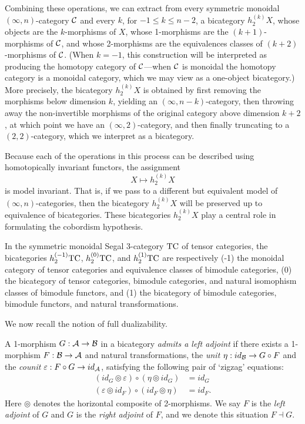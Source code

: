 \documentclass[a4paper]{amsart}
\begin{document}
Combining these operations, we can extract from every symmetric monoidal $(\infty,n)$-category $\mathcal C$ and every $k$, for $-1 \leq k \leq n-2$, a bicategory $h^{(k)}_2 X$, whose objects are the $k$-morphisms of $X$, whose 1-morphisms are the $(k+1)$-morphisms of $\mathcal C$, and whose 2-morphisms are the equivalences classes of $(k+2)$-morphisms of $\mathcal C$. (When $k=-1$, this construction will be interpreted as producing the homotopy category of $\mathcal C$---when $\mathcal C$ is monoidal the homotopy category is a monoidal category, which we may view as a one-object bicategory.)  More precisely, the bicategory $h^{(k)}_2 X$ is obtained by first removing the morphisms below dimension $k$, yielding an $(\infty,n-k)$-category, then throwing away the non-invertible morphisms of the original category above dimension $k+2$, at which point we have an $(\infty,2)$-category, and then finally truncating to a $(2,2)$-category, which we interpret as a bicategory. 

Because each of the operations in this process can be described using homotopically invariant functors, the assignment
\begin{equation*}
	X \mapsto h^{(k)}_2 X
\end{equation*}
is model invariant. That is, if we pass to a different but equivalent model of $(\infty,n)$-categories, then the bicategory  $h^{(k)}_2 X$ will be preserved up to equivalence of bicategories. These bicategories $h^{(k)}_2 X$ play a central role in formulating the cobordism hypothesis.

\begin{example}
	In the symmetric monoidal Segal 3-category $\mathrm{TC}$ of tensor categories, the bicategories $h^{(-1)}_2 \mathrm{TC}$, $h^{(0)}_2 \mathrm{TC}$, and $h^{(1)}_2 \mathrm{TC}$ are respectively (-1) the monoidal category of tensor categories and equivalence classes of bimodule categories, (0) the bicategory of tensor categories, bimodule categories, and natural isomophism classes of bimodule functors, and (1) the bicategory of bimodule categories, bimodule functors, and natural transformations.
\end{example}

We now recall the notion of full dualizability.

\begin{definition} \label{def:adjoints_in_bicat}
		A 1-morphism $G: \mathcal A \to \mathcal B$ in a bicategory {\em admits a left adjoint} if there exists a 1-morphism $F: \mathcal B \to \mathcal A$ and natural transformations, the {\em unit} $\eta: id_{\mathcal B} \to G \circ F$ and the {\em counit} $\varepsilon: F \circ G \to id_{\mathcal A}$, satisfying the following pair of `zigzag' equations:
		\begin{align*}
			(id_{G} \circledcirc \varepsilon  ) \circ (  \eta \circledcirc id_{G}) &= id_{G} \\
			(\varepsilon \circledcirc id_{F}) \circ (id_{F} \circledcirc \eta) &= id_{F}.
		\end{align*}
	Here $\circledcirc$ denotes the horizontal composite of 2-morphisms.
	We say $F$ is the {\em left adjoint} of $G$ and $G$ is the {\em right adjoint} of $F$, and we denote this situation $F \dashv G$.
\end{definition}
\end{document}
